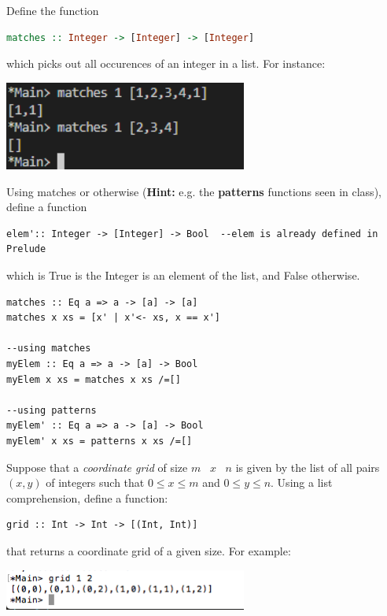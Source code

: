 \documentclass{article}
\begin{document}
\begin{Exercise}
Define the function 
\begin{lstlisting}[language=Haskell]
matches :: Integer -> [Integer] -> [Integer]
\end{lstlisting}
which picks out all occurences of an integer in a list. For instance:
\begin{center}
	\includegraphics[width=8cm]{img/06.png}
\end{center}
Using matches or otherwise (\textbf{Hint: }e.g. the \textbf{patterns} functions seen in class), define a function 
\begin{lstlisting}
elem':: Integer -> [Integer] -> Bool  --elem is already defined in Prelude
\end{lstlisting}
which is True is the Integer is an element of the list, and False otherwise. 
\end{Exercise}
\begin{Answer}
\begin{lstlisting}
matches :: Eq a => a -> [a] -> [a]
matches x xs = [x' | x'<- xs, x == x']

--using matches
myElem :: Eq a => a -> [a] -> Bool
myElem x xs = matches x xs /=[]

--using patterns
myElem' :: Eq a => a -> [a] -> Bool
myElem' x xs = patterns x xs /=[]
\end{lstlisting}

\end{Answer}
\pagebreak
\begin{Exercise}
Suppose that a \textit{coordinate grid} of size $m$ \ $x$ \  $n$ is given by the list of all pairs $(x,y)$ of integers such that 
$ 0 \leq x \leq m $ and $ 0 \leq  y \leq n$. 
Using a list comprehension, define  a function:
\begin{center}
\begin{lstlisting}
grid :: Int -> Int -> [(Int, Int)]
\end{lstlisting}
\end{center}
that returns a coordinate grid of a given size. For example:
\begin{center}
	\includegraphics[width=8cm]{img/01.png}
\end{center}
\end{Exercise}
\end{document}
